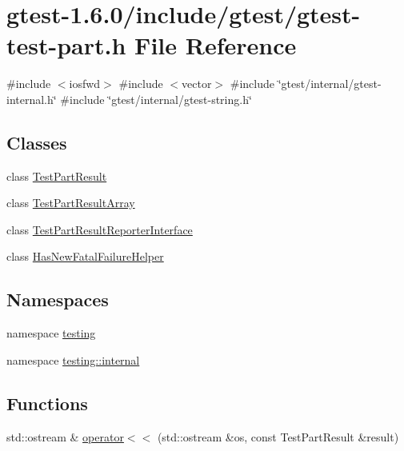 \hypertarget{gtest-test-part_8h}{\section{gtest-\/1.6.0/include/gtest/gtest-\/test-\/part.h \-File \-Reference}
\label{d1/d01/gtest-test-part_8h}
}
{\ttfamily \#include $<$iosfwd$>$}\*
{\ttfamily \#include $<$vector$>$}\*
{\ttfamily \#include \char`\"{}gtest/internal/gtest-\/internal.\-h\char`\"{}}\*
{\ttfamily \#include \char`\"{}gtest/internal/gtest-\/string.\-h\char`\"{}}\*
\subsection*{\-Classes}
\begin{DoxyCompactItemize}
\item 
class \hyperlink{classtesting_1_1TestPartResult}{\-Test\-Part\-Result}
\item 
class \hyperlink{classtesting_1_1TestPartResultArray}{\-Test\-Part\-Result\-Array}
\item 
class \hyperlink{classtesting_1_1TestPartResultReporterInterface}{\-Test\-Part\-Result\-Reporter\-Interface}
\item 
class \hyperlink{classtesting_1_1internal_1_1HasNewFatalFailureHelper}{\-Has\-New\-Fatal\-Failure\-Helper}
\end{DoxyCompactItemize}
\subsection*{\-Namespaces}
\begin{DoxyCompactItemize}
\item 
namespace \hyperlink{namespacetesting}{testing}
\item 
namespace \hyperlink{namespacetesting_1_1internal}{testing\-::internal}
\end{DoxyCompactItemize}
\subsection*{\-Functions}
\begin{DoxyCompactItemize}
\item 
std\-::ostream \& \hyperlink{namespacetesting_ae8b6df347210c0ebfe5ec995d03c7aed}{operator$<$$<$} (std\-::ostream \&os, const \-Test\-Part\-Result \&result)
\end{DoxyCompactItemize}
